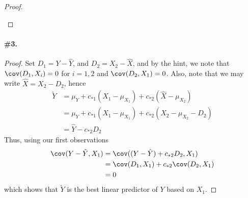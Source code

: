\documentclass[12pt,titlepage]{article}
\begin{document}
\begin{proof}
\begin{enumerate}
\end{enumerate}

\end{proof}


\paragraph{\#3.}
\begin{proof}
Set $D_1 = Y - \hat{Y}$, and $D_2 = X_2 - \hat{X}$, and by the hint, we note that $\cov(D_1, X_i) = 0$ for $i=1,2$ and $\cov(D_2, X_1) = 0$. Also, note that we may write $\hat{X} = X_2 - D_2$, hence
\begin{align*}
\tilde{Y} &= \mu_{Y} + c_{*1}(X_1 - \mu_{X_1}) + c_{*2}(\hat{X}-\mu_{X_2}) \\
&= \mu_{Y} + c_{*1}(X_1 - \mu_{X_1}) + c_{*2}(X_2 -\mu_{X_2} - D_2) \\
&= \hat{Y} - c_{*2} D_2
\end{align*}
Thus, using our first observations 
\begin{align*}
\cov(Y - \tilde{Y}, X_1) &= \cov((Y-\hat{Y}) + c_{*2}D_2, X_1) \\
&= \cov(D_1, X_1) + c_{*2}\cov(D_2,X_1) \\
&= 0
\end{align*}
which shows that $\tilde{Y}$ is the best linear predictor of $Y$ based on $X_1$. 
\end{proof}
\end{document}
